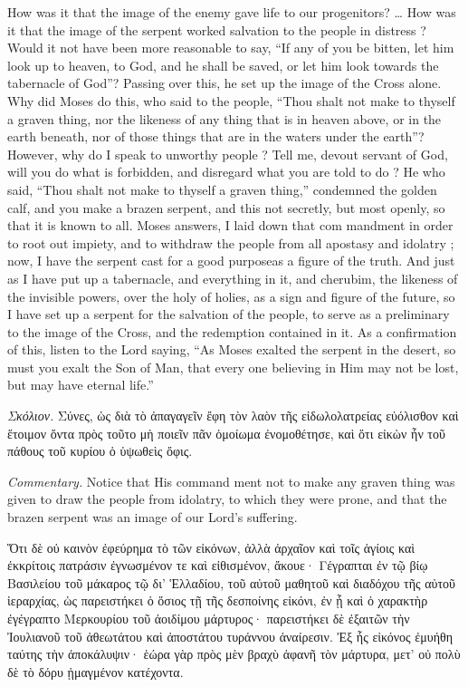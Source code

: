 \documentclass[10pt]{book}
\newcommand{\switchGreek}[1][]{\selectlanguage{polutonikogreek} \switchcolumn*[#1]}
\newcommand{\switchEnglish}{\selectlanguage{english} \switchcolumn}
\begin{document}
\begin{paracol}{2}
How was it that the image of the enemy 
gave life to our progenitors? \ldots
How was it that the image of the serpent 
worked salvation to the people in distress ? 
Would it not have been more reasonable to 
say, ``If any of you be bitten, let him look up to 
heaven, to God, and he shall be saved, or let 
him look towards the tabernacle of God''? 
Passing over this, he set up the image of the 
Cross alone. Why did Moses do this, who 
said to the people, ``Thou shalt not make to 
thyself a graven thing, nor the likeness of any 
thing that is in heaven above, or in the earth 
beneath, nor of those things that are in the 
waters under the earth''? However, why do 
I speak to unworthy people ? Tell me, devout 
servant of God, will you do what is forbidden, 
and disregard what you are told to do ? He 
who said, ``Thou shalt not make to thyself a 
graven thing,'' condemned the golden calf, and 
you make a brazen serpent, and this not 
secretly, but most openly, so that it is known to 
all. Moses answers, I laid down that com 
mandment in order to root out impiety, and to 
withdraw the people from all apostasy and 
idolatry ; now, I have the serpent cast for a 
good purpose\textemdash as a figure of the truth. And 
just as I have put up a tabernacle, and everything
in it, and cherubim, the likeness of the 
invisible powers, over the holy of holies, as a 
sign and figure of the future, so I have set 
up a serpent for the salvation of the people, to 
serve as a preliminary to the image of the 
Cross, and the redemption contained in it. As 
a confirmation of this, listen to the Lord saying, 
``As Moses exalted the serpent in the desert, so 
must you exalt the Son of Man, that every one 
believing in Him may not be lost, but may 
have eternal life.''

\switchGreek

\emph{Σκόλιον.} Σύνες, ὡς διὰ τὸ ἀπαγαγεῖν ἔφη τὸν λαὸν τῆς εἰδωλολατρείας
εὐόλισθον καὶ ἕτοιμον ὄντα πρὸς τοῦτο μὴ ποιεῖν πᾶν ὁμοίωμα ἐνομοθέτησε, καὶ
ὅτι εἰκὼν ἦν τοῦ πάθους τοῦ κυρίου ὁ ὑψωθεὶς ὄφις.

\switchEnglish

\emph{Commentary.} 
Notice that His command 
ment not to make any graven thing was given 
to draw the people from idolatry, to which they 
were prone, and that the brazen serpent was an 
image of our Lord's suffering. 

\switchGreek

Ὅτι δὲ οὐ καινὸν ἐφεύρημα τὸ τῶν εἰκόνων, ἀλλὰ ἀρχαῖον καὶ τοῖς ἁγίοις καὶ
ἐκκρίτοις πατράσιν ἐγνωσμένον τε καὶ εἰθισμένον, ἄκουε·
Γέγραπται ἐν τῷ βίῳ Βασιλείου τοῦ μάκαρος τῷ δι’ Ἑλλαδίου, τοῦ αὐτοῦ μαθητοῦ
καὶ διαδόχου τῆς αὐτοῦ ἱεραρχίας, ὡς παρειστήκει ὁ ὅσιος τῇ τῆς δεσποίνης
εἰκόνι, ἐν ᾗ καὶ ὁ χαρακτὴρ ἐγέγραπτο Μερκουρίου τοῦ ἀοιδίμου μάρτυρος·
παρειστήκει δὲ ἐξαιτῶν τὴν Ἰουλιανοῦ τοῦ ἀθεωτάτου καὶ ἀποστάτου τυράννου
ἀναίρεσιν. Ἐξ ἧς εἰκόνος ἐμυήθη ταύτης τὴν ἀποκάλυψιν· ἑώρα γὰρ πρὸς μὲν βραχὺ
ἀφανῆ τὸν μάρτυρα, μετ’ οὐ πολὺ δὲ τὸ δόρυ ᾑμαγμένον κατέχοντα.


\end{paracol}
\end{document}
